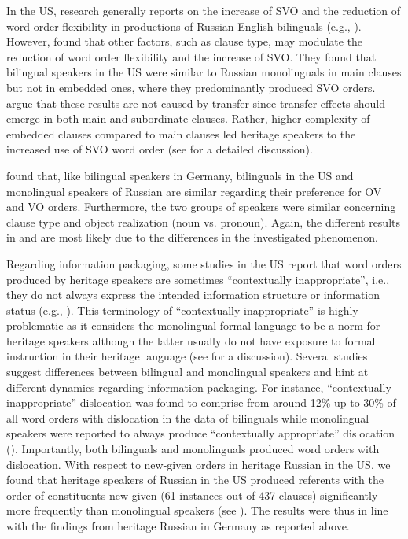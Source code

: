 \documentclass[output=paper,colorlinks,citecolor=brown]{langscibook}
\begin{document}
In the US, research generally reports on the increase of SVO and the reduction of word order flexibility in productions of Russian-English bilinguals (e.g., \cite{isurin_cross-linguistic_2005, kagan_russian_2006, polinsky_incomplete_2006, isurin_lost_2008, laleko_word_2018}). However, \citet{zuban_word_2021} found that other factors, such as clause type, may modulate the reduction of word order flexibility and the increase of SVO. They found that bilingual speakers in the US were similar to Russian monolinguals in main clauses but not in embedded ones, where they predominantly produced SVO orders. \citet{zuban_word_2021} argue that these results are not caused by transfer since transfer effects should emerge in both main and subordinate clauses. Rather, higher complexity of embedded clauses compared to main clauses led heritage speakers to the increased use of SVO word order (see \cite{zuban_word_2021} for a detailed discussion).

\citet{martynova_ovvo_nodate} found that, like bilingual speakers in Germany, bilinguals in the US and monolingual speakers of Russian are similar regarding their preference for OV and VO orders. Furthermore, the two groups of speakers were similar concerning clause type and object realization (noun vs. pronoun). Again, the different results in \citet{martynova_ovvo_nodate} and \citet{zuban_word_2021} are most likely due to the differences in the investigated phenomenon.

Regarding information packaging, some studies in the US report that word orders produced by heritage speakers are sometimes “contextually inappropriate”, i.e., they do not always express the intended information structure or information status (e.g., \cite{laleko_word_2018, kisselev_word_2019}). This terminology of “contextually inappropriate”  is highly problematic as it considers the monolingual formal language to be a norm for heritage speakers although the latter usually do not have exposure to formal instruction in their heritage language (see \cite{wiese_heritage_2022} for a discussion). Several studies suggest differences between bilingual and monolingual speakers and hint at different dynamics regarding information packaging. For instance, “contextually inappropriate” dislocation was found to comprise from around 12\% up to 30\% of all word orders with dislocation in the data of bilinguals while monolingual speakers were reported to always produce “contextually appropriate” dislocation (\cites[203]{laleko_word_2018}[164]{kisselev_word_2019}). Importantly, both bilinguals and monolinguals produced word orders with dislocation. With respect to new-given orders in heritage Russian in the US, we found that heritage speakers of Russian in the US produced referents with the order of constituents new-given (61 instances out of 437 clauses) significantly more frequently than monolingual speakers (see \cite{zuban_unexpected_2023, zuban_word_submitted}). The results were thus in line with the findings from heritage Russian in Germany as reported above.
\end{document}
